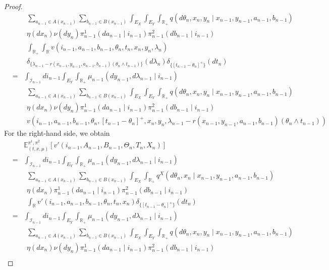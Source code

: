 \documentclass[12pt]{article}
\begin{document}
\begin{proof}
\begin{eqnarray*}
&&~~
\sum_{a_{n-1}\in A(x_{n-1})}\sum_{b_{n-1}\in B(x_{n-1})}
\int_{E_X}\int_{E_Y}\int_{\mathbb{R}_+}
q(d\theta_n,x_n,y_n\mid x_{n-1},y_{n-1},a_{n-1},b_{n-1})\\
&&~~
\eta(dx_n)\nu(dy_n)
\pi^1_{n-1}(da_{n-1}\mid i_{n-1})\pi^2_{n-1}(db_{n-1}\mid i_{n-1})\\
&&~~
\int_{\mathbb{R}_+}\int_{\mathbb{R}}
v(i_{n-1},a_{n-1},b_{n-1},\theta_n,t_n,x_n,y_n,\lambda_n)\\
&&~~
\delta_{\{\lambda_{n-1}-r(x_{n-1},y_{n-1},a_{n-1},b_{n-1})(\theta_n\wedge t_{n-1})\}}(d\lambda_n)\delta_{\{[t_{n-1}-\theta_n]^+\}}(dt_n)\\
&=&\int_{\mathscr{I}_{n-1}}di_{n-1}
\int_{E_Y}\int_{\mathbb{R}_+}\mu_{n-1}(dy_{n-1},d\lambda_{n-1}\mid i_{n-1})\\
&&~~
\sum_{a_{n-1}\in A(x_{n-1})}\sum_{b_{n-1}\in B(x_{n-1})}
\int_{E_X}\int_{E_Y}\int_{\mathbb{R}_+}
q(d\theta_n,x_n,y_n\mid x_{n-1},y_{n-1},a_{n-1},b_{n-1})\\
&&~~
\eta(dx_n)\nu(dy_n)
\pi^1_{n-1}(da_{n-1}\mid i_{n-1})\pi^2_{n-1}(db_{n-1}\mid i_{n-1})\\
&&~~
v(i_{n-1},a_{n-1},b_{n-1},\theta_n,[t_{n-1}-\theta_n]^+,x_n,y_n,
\lambda_{n-1}-r(x_{n-1},y_{n-1},a_{n-1},b_{n-1})(\theta_n\wedge t_{n-1}))
\end{eqnarray*}
For the right-hand side, we obtain
\begin{eqnarray*}
&&\mathbb{E}^{\pi^1,\pi^2}_{(t,x,\mu)}[v'(i_{n-1},A_{n-1},B_{n-1},\Theta_n,T_n,X_n)]\\
&=&\int_{\mathscr{I}_{n-1}}di_{n-1}
\int_{E_Y}\int_{\mathbb{R}_+}\mu_{n-1}(dy_{n-1},d\lambda_{n-1}\mid i_{n-1})\\
&&~~
\sum_{a_{n-1}\in A(x_{n-1})}\sum_{b_{n-1}\in B(x_{n-1})}
\int_{E_X}\int_{\mathbb{R}_+}
q^X(d\theta_n,x_n\mid x_{n-1},y_{n-1},a_{n-1},b_{n-1})\\
&&~~
\eta(dx_n)
\pi^1_{n-1}(da_{n-1}\mid i_{n-1})\pi^2_{n-1}(db_{n-1}\mid i_{n-1})\\
&&~~
\int_{\mathbb{R}}v'(i_{n-1},a_{n-1},b_{n-1},\theta_n,t_n,x_n)
\delta_{\{[t_{n-1}-\theta_n]^+\}}(dt_n)\\
&=&\int_{\mathscr{I}_{n-1}}di_{n-1}
\int_{E_Y}\int_{\mathbb{R}_+}\mu_{n-1}(dy_{n-1},d\lambda_{n-1}\mid i_{n-1})\\
&&~~
\sum_{a_{n-1}\in A(x_{n-1})}\sum_{b_{n-1}\in B(x_{n-1})}
\int_{E_X}\int_{E_Y}\int_{\mathbb{R}_+}
q(d\theta_n,x_n,y_n\mid x_{n-1},y_{n-1},a_{n-1},b_{n-1})\\
&&~~
\eta(dx_n)\nu(dy_n)
\pi^1_{n-1}(da_{n-1}\mid i_{n-1})\pi^2_{n-1}(db_{n-1}\mid i_{n-1})\\

\end{eqnarray*}
\end{proof}
\end{document}
